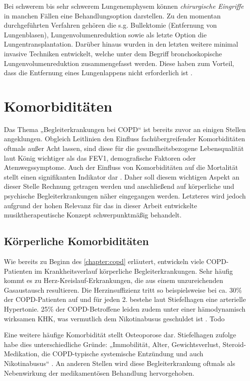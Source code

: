 Bei schwerem bis sehr schwerem Lungenemphysem können \emph{chirurgische Eingriffe} in manchen Fällen eine Behandlungsoption darstellen. Zu den momentan durchgeführten Verfahren gehören die s.g. Bullektomie (Entfernung von Lungenblasen), Lungenvolumenreduktion sowie als letzte Option die Lungentransplantation. Darüber hinaus wurden in den letzten weitere minimal invasive Techniken entwickelt, welche unter dem Begriff bronchoskopische Lungenvolumenreduktion zusammengefasst werden. Diese haben zum Vorteil, dass die Entfernung eines Lungenlappens nicht erforderlich ist \autocite[vgl.][e23]{vogelmeier2007}.

\section{Komorbiditäten}
\label{komorbiditaeten}
Das Thema „Begleiterkrankungen bei COPD“ ist bereits zuvor an einigen Stellen angeklungen. Obgleich Leitlinien den Einfluss fachübergreifender Komorbiditäten oftmals außer Acht lassen, sind diese für die gesundheitsbezogene Lebensqualität laut König wichtiger als das FEV1, demografische Faktoren oder Atemwegssymptome. Auch der Einfluss von Komorbiditäten auf die Mortalität stellt einen signifikanten Indikator dar \autocite[vgl.][395]{koenig2007}.
Daher soll diesem wichtigen Aspekt an dieser Stelle Rechnung getragen werden und anschließend auf körperliche und psychische Begleiterkrankungen näher eingegangen werden. Letzteres wird jedoch aufgrund der hohen Relevanz für das in dieser Arbeit entwickelte musiktherapeutische Konzept schwerpunktmäßig behandelt.


\subsection{Körperliche Komorbiditäten}
Wie bereits zu Beginn des \ref{chapter:copd} erläutert, entwickeln viele COPD-Patienten im Krankheitsverlauf körperliche Begleiterkrankungen. Sehr häufig kommt es zu Herz-Kreislauf-Erkrankungen, die aus einem unzureichenden Gasaustausch resultieren. Die Herzinsuffizienz tritt so beispielsweise bei ca. 30\% der COPD-Patienten auf und für jeden 2. bestehe laut Stiefelhagen eine arterielle Hypertonie. 25\% der COPD-Betroffene leiden zudem unter einer hämodynamisch wirksamen KHK, was vermutlich dem Nikotinabusus geschuldet ist \autocite[vgl.][37]{stiefelhagen2013}. Todo

Eine weitere häufige Komorbidität stellt Osteoporose dar. Stiefelhagen zufolge habe dies unterschiedliche Gründe: „Immobilität, Alter, Gewichtsverlust, Steroid-Medikation, die COPD-typische systemische Entzündung und auch Nikotinabusus“ \autocite[37]{stiefelhagen2013}. An anderen Stellen wird diese Begleiterkrankung oftmals als Nebenwirkung der medikamentösen Behandlung hervorgehoben. 

